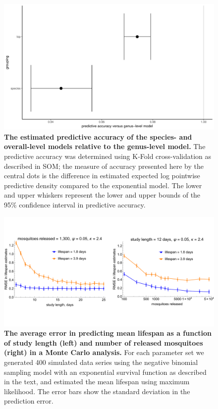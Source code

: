 \documentclass[12pt]{article}
\begin{document}
{\begin{figure}[h]
	\centerline{\includegraphics[width=1\textwidth]{./Figure_files/mrr_genus_vs_species_vs_top.pdf}}
	\caption{\textbf{The estimated predictive accuracy of the species- and overall-level models relative to the genus-level model.} The predictive accuracy was determined using K-Fold cross-validation as described in SOM; the measure of accuracy presented here by the central dots is the difference in estimated expected log pointwise predictive density compared to the exponential model. The lower and upper whiskers represent the lower and upper bounds of the 95\% confidence interval in predictive accuracy.}
	\label{fig:mrr_genusTopLevel}
\end{figure}

\begin{figure}[ht]
	\centerline{\includegraphics[width=1.25\textwidth]{./Figure_files/mrr_mcPowerAnalysis.pdf}}
	\caption{\textbf{The average error in predicting mean lifespan as a function of study length (left) and number of released mosquitoes (right) in a Monte Carlo analysis.} For each parameter set we generated 400 simulated data series using the negative binomial sampling model with an exponential survival function as described in the text, and estimated the mean lifespan using maximum likelihood. The error bars show the standard deviation in the prediction error.}
	\label{fig:mrr_mcPowerAnalysis}
\end{figure}


}
\end{document}
